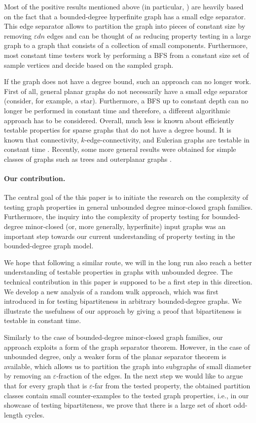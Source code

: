 \documentclass[11pt]{article}
\def\epsilon{\ensuremath{\varepsilon}}
\begin{document}
Most of the positive results mentioned above (in particular, \cite{CSS09,NS11,BSS08,HKNO09}) are heavily based on the fact that a bounded-degree hyperfinite
graph has a small edge separator. This edge separator allows to partition the graph into pieces of constant size by removing $\epsilon d n$ edges and can be thought of as reducing property testing in a large graph to a graph that consists of a collection of small components. Furthermore, most constant time testers work by performing a BFS from a constant size set of sample vertices and decide based on the sampled graph.

If the graph does not have a degree bound, such an approach can no longer work. First of all, general planar graphs do not necessarily have a small edge separator (consider, for example, a star). Furthermore, a BFS up to constant depth can no longer be performed in constant time and therefore, a different algorithmic approach
has to be considered. Overall, much less is known about efficiently testable properties for sparse graphs that do not have a degree bound.
It is known that connectivity, $k$-edge-connectivity, and Eulerian graphs are testable in constant time \cite{MR06}. Recently,
some more general results were obtained for simple classes of graphs such as trees \cite{KY14} and outerplanar graphs \cite{BKN16}.


\paragraph{Our contribution.}
The central goal of the this paper is to initiate the research on the complexity of testing graph properties in
general unbounded degree minor-closed graph families. Furthermore, the inquiry into the complexity of property testing for bounded-degree minor-closed (or, more generally, hyperfinite) input graphs was an important step towards our current understanding of property testing in the bounded-degree graph model.

We hope that following a similar route, we will in the long run also reach a better understanding of testable properties in graphs with unbounded degree.
The technical contribution in this paper is supposed to be a first step in this direction. We develop a new analysis of a random walk approach, which
was first introduced in \cite{GR99} for testing bipartiteness in arbitrary bounded-degree graphs. We
illustrate the usefulness of our approach by giving a proof that bipartiteness is testable in constant time.

Similarly to the case of bounded-degree minor-closed graph families, our approach exploits a form of the graph separator theorem.
However, in the case of unbounded degree, only
a weaker form of the planar separator theorem is available, which allows us to partition the graph into subgraphs of small diameter by removing an $\epsilon$-fraction of the edges. In the next step we would like to argue that for every graph that is $\epsilon$-far from the tested property, the obtained partition
classes contain small counter-examples to the tested graph properties, i.e., in our showcase of testing bipartiteness, we prove that there is a large set of
short odd-length cycles.
\end{document}
